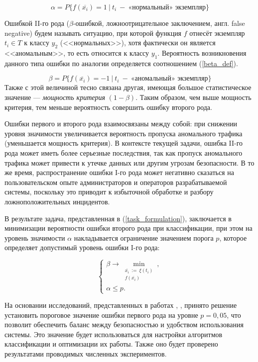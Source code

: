 \begin{equation}\label{alpha_def}
    \alpha = P \Big\{ f(\overline{x_i}) = 1 \ \Big|\ t_i\ -\ \text{«нормальный» экземпляр} \Big\}
\end{equation}

Ошибкой II-го рода ($\beta$-ошибкой, ложноотрицательное заключением, англ. false negative) будем называть ситуацию, при которой функция $f$ отнесёт экземпляр $t_i \in T$ к классу $y_2$ (<<нормальных>>), хотя фактически он является <<аномальным>>, то есть относится к классу $y_1$. Вероятность возникновения данного типа ошибки по аналогии определяется соотношением (\ref{beta_def}).

\begin{equation}\label{beta_def}
    \beta = P \Big\{ f(\overline{x_i}) = -1 \ \Big|\ t_i\ -\ \text{«аномальный» экземпляр} \Big\}
\end{equation}
Также с этой величиной тесно связана другая, имеющая большое статистическое значение --- \textit{мощность критерия} $(1 - \beta)$. Таким образом, чем выше мощность критерия, тем меньше вероятность совершить ошибку второго рода.

Ошибки первого и второго рода взаимосвязаны между собой: при снижении уровня значимости увеличивается вероятность пропуска аномального трафика (уменьшается мощность критерия). В контексте текущей задачи, ошибка II-го рода может иметь более серьезные последствия, так как пропуск аномального трафика может привести к утечке данных или другим угрозам безопасности. В то же время, распространение ошибки I-го рода может негативно сказаться на пользовательском опыте администраторов и операторов разрабатываемой системы, поскольку это приводит к избыточной обработке и разбору ложноположительных инцидентов.

В результате задача, представленная в (\ref{task_formulation}),  заключается в минимизации вероятности ошибки второго рода при классификации, при этом на уровень значимости $\alpha$ накладывается ограничение значением порога $p$, которое определяет допустимый уровень ошибки I-го рода:

\begin{equation}\label{task_formulation}
    \begin{cases}
         \beta \rightarrow \min\limits_{
            \substack{
                \overline{x_i}\ :=\ \xi(t_i) \\
                f(\overline{x_i})
            }
        },
        \\
        \alpha \leq p.
    \end{cases}
\end{equation}

На основании исследований, представленных в работах \cite{Threshold-Adaptation}, \cite{Vasilyev-IS}, \cite{Detect-Anomalies-Deep-NN} принято решение установить пороговое значение ошибки первого рода на уровне $p = 0,05$, что позволит обеспечить баланс между безопасностью и удобством использования системы. Это значение будет использоваться для настройки алгоритмов классификации и оптимизации их работы. Также оно будет проверено результатами проводимых численных экспериментов.
